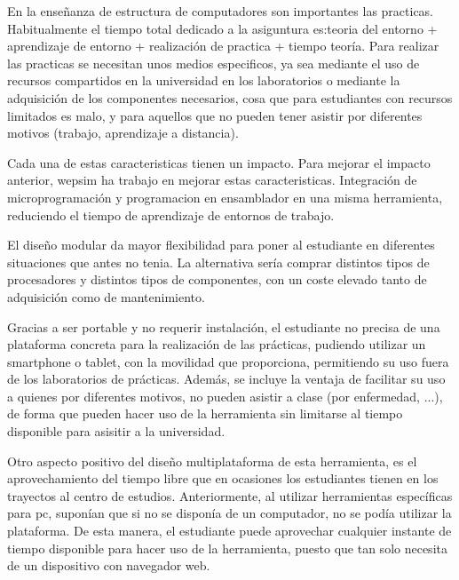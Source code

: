 En la enseñanza de estructura de computadores son importantes las practicas. Habitualmente el tiempo total dedicado a la asiguntura es:teoria del entorno + aprendizaje de entorno + realización de practica + tiempo teoría. Para realizar las practicas se necesitan unos medios especificos, ya sea mediante el uso de recursos compartidos en la universidad en los laboratorios o mediante la adquisición de los componentes necesarios, cosa que para estudiantes con recursos limitados es malo, y para aquellos que no pueden tener asistir por diferentes motivos (trabajo, aprendizaje a distancia).

Cada una de estas caracteristicas tienen un impacto. Para mejorar el impacto anterior, \acrshort{wepsim} ha trabajo en mejorar estas caracteristicas. Integración de microprogramación y programacion en \gls{ensamblador} en una misma herramienta, reduciendo el tiempo de aprendizaje de entornos de trabajo. 

El diseño modular da mayor flexibilidad para poner al estudiante en diferentes situaciones que antes no tenia. La alternativa sería comprar distintos tipos de procesadores y distintos tipos de componentes, con un coste elevado tanto de adquisición como de mantenimiento.

Gracias a ser portable y no requerir instalación, el estudiante no precisa de una plataforma concreta para la realización de  las prácticas, pudiendo utilizar un smartphone o tablet, con la movilidad que proporciona, permitiendo su uso fuera de los laboratorios de prácticas. Además, se incluye la ventaja de facilitar su uso a quienes por diferentes motivos, no pueden asistir a clase (por enfermedad, ...), de forma que pueden hacer uso de la herramienta sin limitarse al tiempo disponible para asisitir a la universidad.

Otro aspecto positivo del diseño multiplataforma de esta herramienta, es el aprovechamiento del tiempo libre que en ocasiones los estudiantes tienen en los trayectos al centro de estudios. Anteriormente, al utilizar herramientas específicas para \acrshort{pc}, suponían que si no se disponía de un computador, no se podía utilizar la plataforma. De esta manera, el estudiante puede aprovechar cualquier instante de tiempo disponible para hacer uso de la herramienta, puesto que tan solo necesita de un dispositivo con navegador web.




